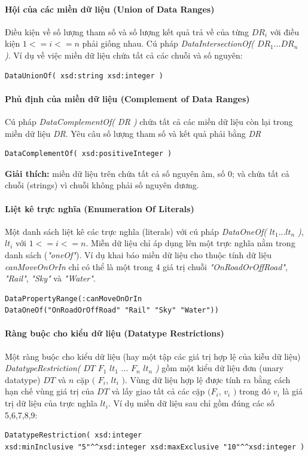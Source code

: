 \paragraph{Hội của các miền dữ liệu (Union of Data Ranges)}
Điều kiện về số lượng tham số và số lượng kết quả trả về của từng $DR_{i}$ với điều kiện $1 <= i <= n$ phải giống nhau. Cú pháp \textit{DataIntersectionOf( $DR_{1} ... DR_{n}$ )}. Ví dụ về việc miền dữ liệu chứa tất cả các chuỗi và số nguyên:
\begin{verbatim}
DataUnionOf( xsd:string xsd:integer )
\end{verbatim}

\paragraph{Phủ định của miền dữ liệu (Complement of Data Ranges)}
Cú pháp \textit{DataComplementOf( DR )} chứa tất cả các miền dữ liệu còn lại trong miền dữ liệu \textit{DR}. Yêu câu số lượng tham số và kết quả phải bằng \textit{DR}
\begin{verbatim}
DataComplementOf( xsd:positiveInteger )
\end{verbatim}
\textbf{Giải thích:} miền dữ liệu trên chứa tất cả số nguyên âm, số 0; và chứa tất cả chuỗi (strings) vì chuỗi không phải số nguyên dương.

\paragraph{Liệt kê trực nghĩa (Enumeration Of Literals)}
Một danh sách liệt kê các trực nghĩa (literals) với cú pháp \textit{DataOneOf(} $lt_{1} ... lt_{n}$ \textit{)},  $lt_{i}$ với $1 <= i <= n$.  Miễn dữ liệu chỉ áp dụng lên một trực nghĩa nằm trong danh sách (\textit{"oneOf"}). Ví dụ khai báo miền dữ liệu cho thuộc tính dữ liệu \textit{canMoveOnOrIn} chỉ có thể là một trong 4 giá trị chuỗi \textit{"OnRoadOrOffRoad"}, \textit{"Rail"}, \textit{"Sky"} và \textit{"Water"}.
\begin{verbatim}
DataPropertyRange(:canMoveOnOrIn 
DataOneOf("OnRoadOrOffRoad" "Rail" "Sky" "Water"))
\end{verbatim}

\paragraph{Ràng buộc cho kiểu dữ liệu (Datatype Restrictions)}
Một ràng buộc cho kiểu dữ liệu (hay một tập các giá trị hợp lệ của kiễu dữ liệu) \textit{DatatypeRestriction(} $DT$ $F_{1}$ $lt_{1}$ ... $F_{n}$ $lt_{n}$ \textit{ )} gồm một kiểu dữ liệu đơn (unary datatype) $DT$ và $n$ cặp $($ $F_{i}$, $lt_{i}$ $)$. Vùng dữ liệu hợp lệ được tính ra bằng cách hạn chế vùng giá trị của $DT$ và lấy giao tất cả các cặp $(F_{i}$, $v_{i}$ $)$ trong đó $v_{i}$ là giá trị dữ liệu của trực nghĩa $lt_{i}$. Ví dụ miền dữ liệu sau chỉ gồm đúng các số 5,6,7,8,9:
\begin{verbatim}
DatatypeRestriction( xsd:integer 
xsd:minInclusive "5"^^xsd:integer xsd:maxExclusive "10"^^xsd:integer )
\end{verbatim}

